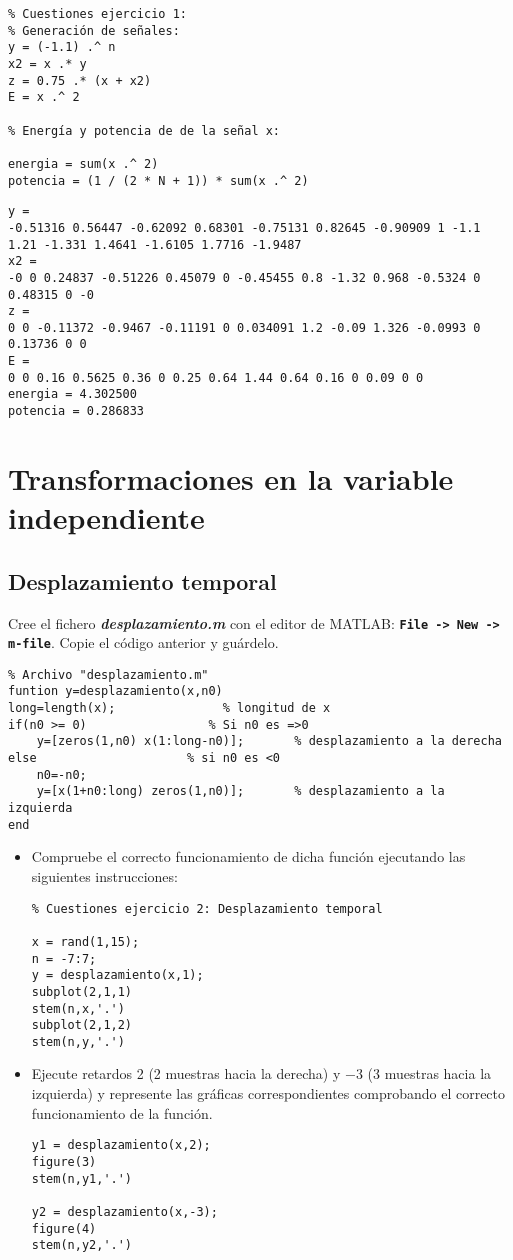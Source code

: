 \documentclass{article}
\begin{document}
\begin{lstlisting}
% Cuestiones ejercicio 1:
% Generación de señales:
y = (-1.1) .^ n
x2 = x .* y
z = 0.75 .* (x + x2)
E = x .^ 2

% Energía y potencia de de la señal x:

energia = sum(x .^ 2)
potencia = (1 / (2 * N + 1)) * sum(x .^ 2)
\end{lstlisting}
\begin{verbatim}
y =
-0.51316 0.56447 -0.62092 0.68301 -0.75131 0.82645 -0.90909 1 -1.1 1.21 -1.331 1.4641 -1.6105 1.7716 -1.9487
x2 =
-0 0 0.24837 -0.51226 0.45079 0 -0.45455 0.8 -1.32 0.968 -0.5324 0 0.48315 0 -0
z =
0 0 -0.11372 -0.9467 -0.11191 0 0.034091 1.2 -0.09 1.326 -0.0993 0 0.13736 0 0
E =
0 0 0.16 0.5625 0.36 0 0.25 0.64 1.44 0.64 0.16 0 0.09 0 0
energia = 4.302500
potencia = 0.286833
\end{verbatim}
\section{Transformaciones en la variable independiente}
\subsection{Desplazamiento temporal}

Cree el fichero \textbf{\textit{desplazamiento.m}} con el editor de MATLAB: \textbf{\texttt{File -> New -> m-file}}. Copie el código anterior y guárdelo.

\begin{lstlisting}
% Archivo "desplazamiento.m"
funtion y=desplazamiento(x,n0)
long=length(x);               % longitud de x
if(n0 >= 0)                 % Si n0 es =>0
	y=[zeros(1,n0) x(1:long-n0)];       % desplazamiento a la derecha
else                     % si n0 es <0
	n0=-n0;
	y=[x(1+n0:long) zeros(1,n0)];       % desplazamiento a la izquierda
end
\end{lstlisting}
\begin{itemize}[label=$-$]
	\item Compruebe el correcto funcionamiento de dicha función ejecutando las siguientes instrucciones:
	
	\begin{lstlisting}
% Cuestiones ejercicio 2: Desplazamiento temporal

x = rand(1,15);
n = -7:7;
y = desplazamiento(x,1);
subplot(2,1,1)
stem(n,x,'.')
subplot(2,1,2)
stem(n,y,'.')
	\end{lstlisting}
	\item Ejecute retardos 2 (2 muestras hacia la derecha) y $-3$ (3 muestras hacia la izquierda) y represente las gráficas correspondientes comprobando el correcto funcionamiento de la función.
	
	\begin{lstlisting}
y1 = desplazamiento(x,2);
figure(3)
stem(n,y1,'.')

y2 = desplazamiento(x,-3);
figure(4)
stem(n,y2,'.')
	\end{lstlisting}
\end{itemize}
\end{document}
